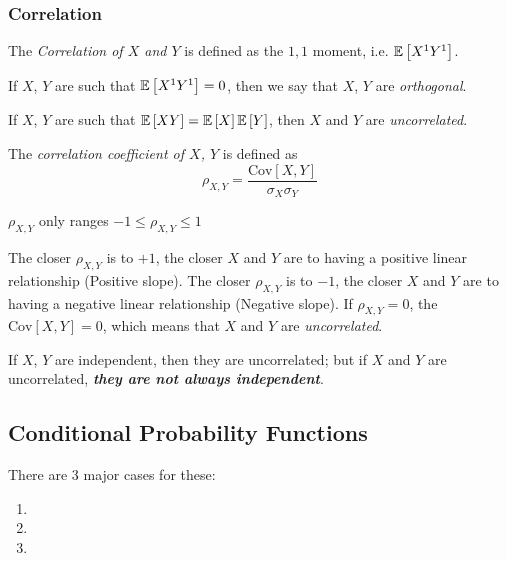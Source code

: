 		\subsubsection{Correlation} \label{subsubsec:Correlation}
			\begin{definition}[Correlation] \label{def:Correlation}
				The \emph{Correlation of $X$ and $Y$} is defined as the $1,1$ moment, i.e. $\operatorname{\mathbb{E}} \left[ X^{1} Y^{1} \right]$.
				\begin{remark}
					If $X$, $Y$ are such that $\operatorname{\mathbb{E}} \left[ X^{1} Y^{1} \right] = 0$, then we say that $X$, $Y$ are \emph{orthogonal}.
				\end{remark}
				\begin{remark}
					If $X$, $Y$ are such that $\operatorname{\mathbb{E}} \left[ XY \right] = \operatorname{\mathbb{E}} \left[ X \right] \operatorname{\mathbb{E}} \left[ Y \right]$, then $X$ and $Y$ are \emph{uncorrelated}.
				\end{remark}
			\end{definition}
			\begin{definition} \label{def:Correlation Coefficient}
				The \emph{correlation coefficient of $X$, $Y$} is defined as
				\begin{equation} \label{eq:Correlation Coefficient}
				\rho_{X,Y} = \frac{\text{Cov} \left[ X,Y \right]}{\sigma_{X} \sigma_{Y}}
				\end{equation}
				\begin{remark}
					$\rho_{X,Y}$ only ranges $-1 \leq \rho_{X,Y} \leq 1$
				\end{remark}
				\begin{remark}
					The closer $\rho_{X,Y}$ is to $+1$, the closer $X$ and $Y$ are to having a positive linear relationship (Positive slope). \newline
					The closer $\rho_{X,Y}$ is to $-1$, the closer $X$ and $Y$ are to having a negative linear relationship (Negative slope). \newline
					If $\rho_{X,Y} = 0$, the $\text{Cov}\left[ X,Y \right] = 0$, which means that $X$ and $Y$ are \emph{uncorrelated}.
				\end{remark}
				\begin{remark}
					If $X$, $Y$ are independent, then they are uncorrelated; but if $X$ and $Y$ are uncorrelated, \emph{\textbf{they are not always independent}}.
				\end{remark}
			\end{definition}
		
		\subsection{Conditional Probability Functions} \label{subsec:Conditional Probability Functions}
		There are 3 major cases for these:
			\begin{enumerate}
				\item {}
				\item {}
				\item {}
			\end{enumerate}
					
